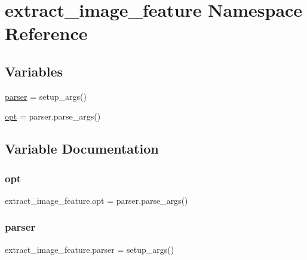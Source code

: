 \hypertarget{namespaceextract__image__feature}{}\section{extract\+\_\+image\+\_\+feature Namespace Reference}
\label{namespaceextract__image__feature}
\subsection*{Variables}
\begin{DoxyCompactItemize}
\item 
\hyperlink{namespaceextract__image__feature_a1e5cbaf17333e7b3a192b412853970f1}{parser} = setup\+\_\+args()
\item 
\hyperlink{namespaceextract__image__feature_a5ee41ae45390d90a69a131d60b829604}{opt} = parser.\+parse\+\_\+args()
\end{DoxyCompactItemize}


\subsection{Variable Documentation}
\mbox{\label{namespaceextract__image__feature_a5ee41ae45390d90a69a131d60b829604}} 
\subsubsection{\texorpdfstring{opt}{opt}}
{\footnotesize\ttfamily extract\+\_\+image\+\_\+feature.\+opt = parser.\+parse\+\_\+args()}

\mbox{\label{namespaceextract__image__feature_a1e5cbaf17333e7b3a192b412853970f1}} 
\subsubsection{\texorpdfstring{parser}{parser}}
{\footnotesize\ttfamily extract\+\_\+image\+\_\+feature.\+parser = setup\+\_\+args()}

